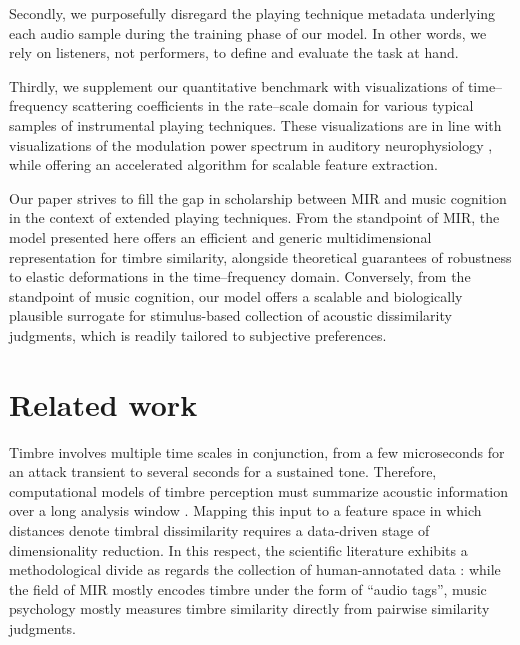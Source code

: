 \documentclass{bmcart}
\newcommand{\lnameref}[1]{%
\bgroup
\let\nmu\MakeLowercase
\nameref{#1}\egroup}
\newcommand{\nmu}{}
\begin{document}
Secondly, we purposefully disregard the playing technique metadata underlying each audio sample during the training phase of our model.
In other words, we rely on listeners, not performers, to define and evaluate the task at hand.

Thirdly, we supplement our quantitative benchmark with visualizations of time--frequency scattering coefficients in the rate--scale domain for various typical samples of instrumental playing techniques.
These visualizations are in line with visualizations of the modulation power spectrum in auditory neurophysiology \cite{patil2012ploscompbiol}, while offering an accelerated algorithm for scalable feature extraction.

Our paper strives to fill the gap in scholarship between MIR and music cognition in the context of extended playing techniques.
From the standpoint of MIR, the model presented here offers an efficient and generic multidimensional representation for timbre similarity, alongside theoretical guarantees of robustness to elastic deformations in the time--frequency domain.
Conversely, from the standpoint of music cognition, our model offers a scalable and biologically plausible surrogate for stimulus-based collection of acoustic dissimilarity judgments, which is readily tailored to subjective preferences.


\section*{\nmu Related work}
\label{sec:related-work}

Timbre involves multiple time scales in conjunction, from a few microseconds for an attack transient to several seconds for a sustained tone.
Therefore, computational models of timbre perception must summarize acoustic information over a long analysis window \cite{joder2009taslp}.
Mapping this input to a feature space in which distances denote timbral dissimilarity requires a data-driven stage of dimensionality reduction.
In this respect, the scientific literature exhibits a methodological divide as regards the collection of human-annotated data \cite{siedenburg2016jnmr}: while the field of MIR mostly encodes timbre under the form of ``audio tags'', music psychology mostly measures timbre similarity directly from pairwise similarity judgments.
\end{document}
